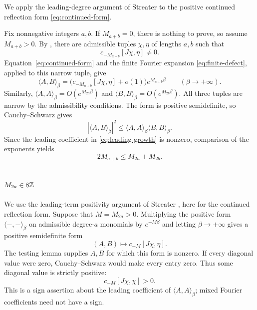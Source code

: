 We apply the leading-degree argument of Streater
\cite[Lemma~2, pp.~113--114]{Streater} to the positive continued
reflection form \eqref{eq:continued-form}.

Fix nonnegative integers $a,b$. If $M_{a+b}=0$, there is nothing to
prove, so assume $M_{a+b}>0$. By , there are
admissible tuples $\chi,\eta$ of lengths $a,b$ such that
\begin{equation}
 c_{-M_{a+b}}[J\chi,\eta]\neq0.
\end{equation}
Equation~\eqref{eq:continued-form} and the finite Fourier expansion
\eqref{eq:finite-defect}, applied to this narrow tuple, give
\begin{equation}\label{eq:leading-growth}
 \langle A,B\rangle_\beta
   =\bigl(c_{-M_{a+b}}[J\chi,\eta]+o(1)\bigr)
                  e^{M_{a+b}\beta}\qquad(\beta\to+\infty).
\end{equation}
Similarly,
$\langle A,A\rangle_\beta=O(e^{M_{2a}\beta})$ and
$\langle B,B\rangle_\beta=O(e^{M_{2b}\beta})$.
All three tuples are narrow by the admissibility conditions.
The form is positive semidefinite, so Cauchy--Schwarz gives
\begin{equation}\label{eq:ext_CS}
 |\langle A,B\rangle_\beta|^2
       \leq\langle A,A\rangle_\beta\langle B,B\rangle_\beta.
\end{equation}
Since the leading coefficient in \eqref{eq:leading-growth} is nonzero,
comparison of the exponents yields
\begin{equation}\label{eq:convexity}
 2M_{a+b}\leq M_{2a}+M_{2b}.
\end{equation}

\subsection{$M_{2a}\in8\mathbb{Z}$}

We use the leading-term positivity argument of Streater
\cite[\S6, especially the proof of Lemma~8]{Streater}, here for the
continued reflection form.
Suppose that $M=M_{2a}>0$. Multiplying the positive form
$\langle-,-\rangle_\beta$ on admissible degree-$a$ monomials by $e^{-M\beta}$
and letting $\beta\to+\infty$ gives a positive semidefinite form
\begin{equation}
 (A,B)\longmapsto c_{-M}[J\chi,\eta].
\end{equation}
The testing lemma supplies $A,B$ for which this form is nonzero.
If every diagonal value were zero, Cauchy--Schwarz would make every
entry zero. Thus some diagonal value is strictly positive:
\begin{equation}\label{eq:c_pos}
 c_{-M}[J\chi,\chi]>0.
\end{equation}
This is a sign assertion about the leading coefficient of
$\langle A,A\rangle_\beta$; mixed Fourier coefficients need not have a sign.


